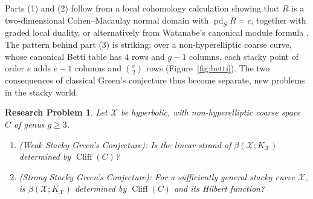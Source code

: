 \documentclass[11pt,reqno]{amsart}
\newtheorem{problem}[lemma]{Research Problem}
\theoremstyle{remark}
\newcommand{\pd}{\operatorname{pd}}
\newcommand{\cliff}{\operatorname{Cliff}}
\newcommand{\cX}{\mathcal{X}}
\begin{document}
Parts (1) and (2) follow from a local cohomology calculation showing that $R$ is a two-dimensional Cohen--Macaulay normal domain with $\pd_SR=c$, together with graded local duality, or alternatively from Watanabe's canonical module formula \cite{watanabe81}. The pattern behind part (3) is striking: over a non-hyperelliptic coarse curve, whose canonical Betti table has $4$ rows and $g-1$ columns, each stacky point of order $e$ adds $e-1$ columns and $\binom{e}{2}$ rows (Figure~\ref{fig:betti}). The two consequences of classical Green's conjecture thus become separate, new problems in the stacky world.

\begin{problem}\label{prob:ws}
Let $\cX$ be hyperbolic, with non-hyperelliptic coarse space $C$ of genus $g\geq3$.\begin{enumerate}
\item (Weak Stacky Green's Conjecture):  Is the linear strand of $\beta(\cX;K_{\cX})$ determined by $\cliff(C)$?
\item (Strong Stacky Green's Conjecture): For a sufficiently general stacky curve $\cX$, is $\beta(\cX;K_{\cX})$ determined by $\cliff(C)$ and its Hilbert function?
\end{enumerate}
\end{problem}

\end{document}
